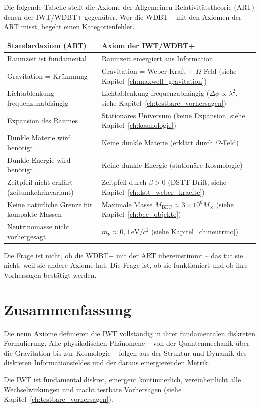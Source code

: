 Die folgende Tabelle stellt die Axiome der Allgemeinen Relativitätstheorie (ART) 
denen der IWT/WDBT+ gegenüber. Wer die WDBT+ mit den Axiomen der ART misst, 
begeht einen Kategorienfehler.

\begin{tabular}{|l|l|}
\hline
\textbf{Standardaxiom (ART)} & \textbf{Axiom der IWT/WDBT+} \\
\hline
Raumzeit ist fundamental & Raumzeit emergiert aus Information \\
\hline
Gravitation = Krümmung & Gravitation = Weber-Kraft + \(\Omega\)-Feld (siehe Kapitel~\ref{ch:maxwell_gravitation}) \\
\hline
Lichtablenkung frequenzunabhängig & Lichtablenkung frequenzabhängig (\(\Delta\phi \propto \lambda^2\), siehe Kapitel~\ref{ch:testbare_vorhersagen}) \\
\hline
Expansion des Raumes & Stationäres Universum (keine Expansion, siehe Kapitel~\ref{ch:kosmologie}) \\
\hline
Dunkle Materie wird benötigt & Keine dunkle Materie (erklärt durch \(\Omega\)-Feld) \\
\hline
Dunkle Energie wird benötigt & Keine dunkle Energie (stationäre Kosmologie) \\
\hline
Zeitpfeil nicht erklärt (zeitumkehrinvariant) & Zeitpfeil durch \(\dot{\beta}>0\) (DSTT-Drift, siehe Kapitel~\ref{ch:dstt_weber_kraefte}) \\
\hline
Keine natürliche Grenze für kompakte Massen & Maximale Masse \(M_{\text{BEC}} \approx 3\times10^6 M_\odot\) (siehe Kapitel~\ref{ch:bec_objekte}) \\
\hline
Neutrinomasse nicht vorhergesagt & \(m_\nu \approx 0,1\,\text{eV}/c^2\) (siehe Kapitel~\ref{ch:neutrino}) \\
\hline
\end{tabular}

\vspace{0.3cm}
Die Frage ist nicht, ob die WDBT+ mit der ART übereinstimmt – das tut sie nicht, 
weil sie andere Axiome hat. Die Frage ist, ob sie funktioniert und ob ihre Vorhersagen 
bestätigt werden.

\section{Zusammenfassung}
\label{sec:axiome_zusammenfassung}

Die neun Axiome definieren die IWT vollständig in ihrer fundamentalen diskreten Formulierung. Alle physikalischen Phänomene – von der Quantenmechanik über die Gravitation bis zur Kosmologie – folgen aus der Struktur und Dynamik des diskreten Informationsfeldes und der daraus emergierenden Metrik.

Die IWT ist fundamental diskret, emergent kontinuierlich, vereinheitlicht alle Wechselwirkungen und macht testbare Vorhersagen (siehe Kapitel~\ref{ch:testbare_vorhersagen}).
